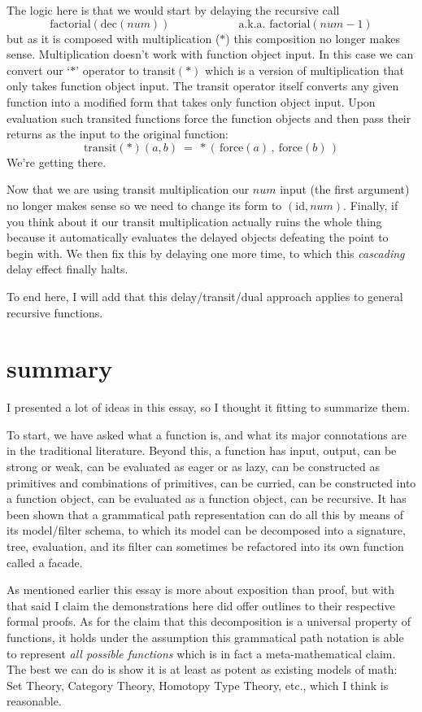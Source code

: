 \documentclass[twoside]{article}
\begin{document}
The logic here is that we would start by delaying the recursive call
$$ \mbox{factorial}(\mbox{dec}(num)) \qquad\qquad\qquad \mbox{a.k.a. factorial}(num-1) $$
but as it is composed with multiplication ($ * $) this composition no longer makes sense. Multiplication
doesn't work with function object input. In this case we can convert our `$ * $' operator to transit$(*)$
which is a version of multiplication that only takes function object input. The transit operator itself
converts any given function into a modified form that takes only function object input. Upon evaluation such
transited functions force the function objects and then pass their returns as the input to the original function:
$$ \mbox{transit}(*)(a, b)\ =\ *(\,\mbox{force}(a)\,,\ \mbox{force}(b)\,) $$
We're getting there.

Now that we are using transit multiplication our $ num $ input (the first argument) no longer makes sense so we need
to change its form to $ (\mbox{id}, num) $. Finally, if you think about it our transit multiplication actually ruins
the whole thing because it automatically evaluates the delayed objects defeating the point to begin with. We then
fix this by delaying one more time, to which this \emph{cascading} delay effect finally halts.

To end here, I will add that this delay/transit/dual approach applies to general recursive functions.

\section*{summary}

I presented a lot of ideas in this essay, so I thought it fitting to summarize them.

To start, we have asked what a function is, and what its major connotations are in the traditional literature.
Beyond this, a function has input, output, can be strong or weak, can be evaluated as eager or as lazy, can be
constructed as primitives and combinations of primitives, can be curried, can be constructed into a function object,
can be evaluated as a function object, can be recursive. It has been shown that a grammatical path representation
can do all this by means of its model/filter schema, to which its model can be decomposed into a signature,
tree, evaluation, and its filter can sometimes be refactored into its own function called a facade.

As mentioned earlier this essay is more about exposition than proof, but with that said I claim the demonstrations here
did offer outlines to their respective formal proofs. As for the claim that this decomposition is a universal property
of functions, it holds under the assumption this grammatical path notation is able to represent \emph{all possible
functions} which is in fact a meta-mathematical claim. The best we can do is show it is at least as potent
as existing models of math: Set Theory, Category Theory, Homotopy Type Theory, etc., which I think is reasonable.
\end{document}
